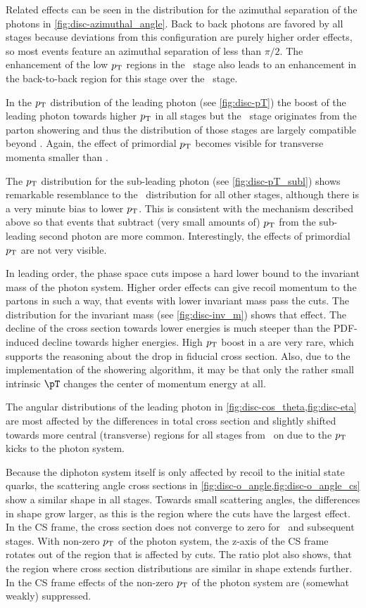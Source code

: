 Related effects can be seen in the distribution for the azimuthal
separation of the photons in \cref{fig:disc-azimuthal_angle}. Back to
back photons are favored by all stages because deviations from
this configuration are purely higher order effects, so most events
feature an azimuthal separation of less than \(\pi/2\). The
enhancement of the low \(p_\mathrm{T}\) regions in the \stthree\ stage also
leads to an enhancement in the back-to-back region for this stage over
the \sttwo\ stage.

In the \(p_\mathrm{T}\) distribution of the leading photon (see
\cref{fig:disc-pT}) the boost of the leading photon towards higher
\(p_\mathrm{T}\) in all stages but the \stone\ stage originates from the parton
showering and thus the distribution of those stages are largely
compatible beyond . Again, the effect of primordial \(p_\mathrm{T}\)
becomes visible for transverse momenta smaller than .

The \(p_\mathrm{T}\) distribution for the sub-leading photon (see
\cref{fig:disc-pT_subl}) shows remarkable resemblance to the \stone\
distribution for all other stages, although there is a very minute
bias to lower \(p_\mathrm{T}\). This is consistent with the mechanism described
above so that events that subtract (very small amounts of) \(p_\mathrm{T}\)
from the sub-leading second photon are more common. Interestingly, the
effects of primordial \(p_\mathrm{T}\) are not very visible.

In leading order, the phase space cuts impose a hard lower bound to
the invariant mass of the photon system. Higher order effects can give
recoil momentum to the partons in such a way, that events with lower
invariant mass pass the cuts. The distribution for the invariant mass
(see \cref{fig:disc-inv_m}) shows that effect. The decline of the
cross section towards lower energies is much steeper than the
PDF-induced decline towards higher energies. High \(p_\mathrm{T}\) boost in a
are very rare, which supports the reasoning about the drop in fiducial
cross section. Also, due to the implementation of the showering
algorithm, it may be that only the rather small intrinsic \(\pT\)
changes the center of momentum energy at all.

The angular distributions of the leading photon in
\cref{fig:disc-cos_theta,fig:disc-eta} are most affected by the
differences in total cross section and slightly shifted towards more
central (transverse) regions for all stages from \sttwo\ on due to the
\(p_\mathrm{T}\) kicks to the photon system.

Because the diphoton system itself is only affected by recoil to the
initial state quarks, the scattering angle cross sections in
\cref{fig:disc-o_angle,fig:disc-o_angle_cs} show a similar shape in
all stages. Towards small scattering angles, the differences in shape
grow larger, as this is the region where the cuts have the largest
effect. In the CS frame, the cross section does not converge to zero
for \sttwo\ and subsequent stages. With non-zero \(p_\mathrm{T}\) of the photon
system, the z-axis of the CS frame rotates out of the region that is
affected by cuts. The ratio plot also shows, that the region where
cross section distributions are similar in shape extends further. In
the CS frame effects of the non-zero \(p_\mathrm{T}\) of the photon system are
(somewhat weakly) suppressed.

